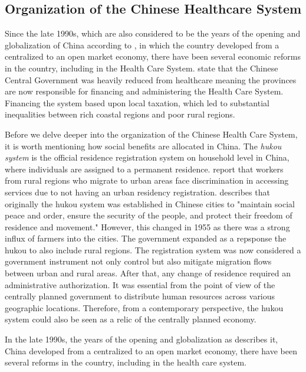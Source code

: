\documentclass[
]{article}
\begin{document}
	\subsection{Organization of the Chinese Healthcare System} \label{orga} 
	Since the late 1990s, which are also considered to be the years of the opening and globalization of China according to \cite{kanbur_fifty_2005} , in which the country developed from a centralized to an open market economy, there have been several economic reforms in the country, including in the Health Care System. \cite{hougaard_chinese_2011} state that the Chinese Central Government was heavily reduced from healthcare meaning the provinces are now responsible for financing and administering the Health Care System. Financing the system based upon local taxation, which led to substantial inequalities between rich coastal regions and poor rural regions. \par
	Before we delve deeper into the organization of the Chinese Health Care System, it is worth mentioning how social benefits are allocated in China.
	The \textit{hukou system} is the official residence registration system on household level in China, where individuals are assigned to a permanent residence.
	\cite{noauthor_oecd_nodate} report that workers from rural regions who migrate to urban areas face discrimination in accessing services due to not having an urban residency registration. 
	\cite{liu_institution_2005} describes  that originally the hukou system was established in Chinese cities to "maintain social peace and order, ensure the security of the people, and protect their freedom of residence and movement." 
	However, this changed in 1955 as there was a strong influx of farmers into the cities. The government expanded as a repsponse the hukou to also include rural regions.  
    The registration system was now considered a government instrument not only control but also mitigate migration flows between urban and rural areas. After that, any change of residence required an administrative authorization. It was essential from the point of view of the centrally planned government to distribute human resources across various geographic locations. Therefore, from a contemporary perspective, the hukou system could also be seen as a relic of the centrally planned economy.

	
	

	
	In the late 1990s, the years of the opening and globalization as \textcite{kanbur_fifty_2005} describes it, China developed from a centralized to an open market economy, there have been several reforms in the country, including in the health care system. 
	
\end{document}
